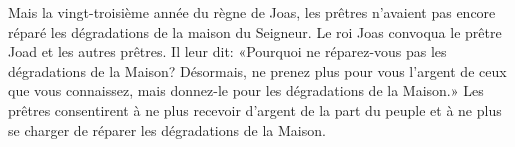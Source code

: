 Mais la vingt-troisième année du règne de Joas,
	les prêtres n’avaient pas encore réparé les dégradations de la maison du Seigneur.
Le roi Joas convoqua le prêtre Joad et les autres prêtres.
Il leur dit:
	«Pourquoi ne réparez-vous pas les dégradations de la Maison?
Désormais, ne prenez plus pour vous l’argent de ceux que vous connaissez,
	mais donnez-le pour les dégradations de la Maison.»
Les prêtres consentirent à ne plus recevoir d’argent de la part du peuple
	et à ne plus se charger de réparer les dégradations de la Maison.
